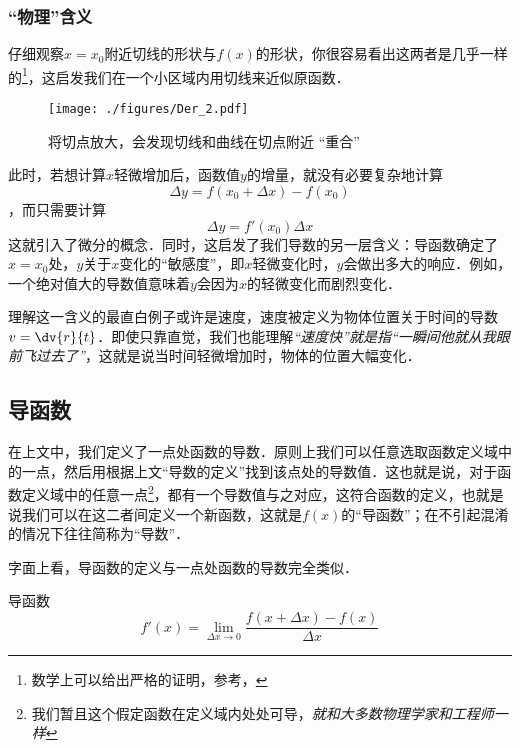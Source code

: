\subsubsection{“物理”含义}
仔细观察$x=x_0$附近切线的形状与$f(x)$的形状，你很容易看出这两者是几乎一样的\footnote{数学上可以给出严格的证明，参考\cite{同济高}，\cite{Thomas}}，这启发我们在一个小区域内用切线来近似原函数．

\begin{figure}[ht]
\centering
\texttt{[image: ./figures/Der\_2.pdf]}
\caption{将切点放大，会发现切线和曲线在切点附近 “重合”}
\end{figure}

此时，若想计算$x$轻微增加后，函数值$y$的增量，就没有必要复杂地计算
$$\Delta y = f(x_0+\Delta x) - f(x_0)$$
，而只需要计算
\begin{equation}
\Delta y = f'(x_0) \Delta x
\end{equation}
这就引入了微分的概念．同时，这启发了我们导数的另一层含义：导函数确定了$x=x_0$处，$y$关于$x$变化的“敏感度”，即$x$轻微变化时，$y$会做出多大的响应．例如，一个绝对值大的导数值意味着$y$会因为$x$的轻微变化而剧烈变化．

理解这一含义的最直白例子或许是速度，速度被定义为物体位置关于时间的导数$v=\dv{r}{t}$．即使只靠直觉，我们也能理解\textsl{“速度快”就是指“一瞬间他就从我眼前飞过去了”}，这就是说当时间轻微增加时，物体的位置大幅变化．

\subsection{导函数}
在上文中，我们定义了一点处函数的导数．原则上我们可以任意选取函数定义域中的一点，然后用根据上文“导数的定义”找到该点处的导数值．这也就是说，对于函数定义域中的任意一点\footnote{我们暂且这个假定函数在定义域内处处可导，\textsl{就和大多数物理学家和工程师一样}}，都有一个导数值与之对应，这符合函数的定义，也就是说我们可以在这二者间定义一个新函数，这就是$f(x)$的“导函数”；在不引起混淆的情况下往往简称为“导数”．

字面上看，导函数的定义与一点处函数的导数完全类似．
\begin{definition}{导函数}
\begin{equation}
f'(x)=\lim_{\Delta x\to0}\frac{f(x+\Delta x)-f(x)}{\Delta x}
\end{equation}
\end{definition}

